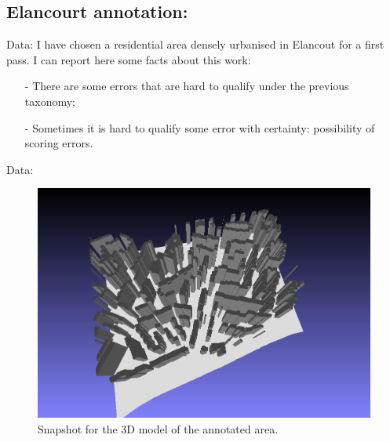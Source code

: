 \documentclass[9pt]{beamer}
\begin{document}
	\subsection[annotation]{Elancourt annotation:}
	\begin{frame}{Data:}
		I have chosen a residential area densely urbanised in Elancout for a first pass. I can report here some facts about this work:
		\begin{itemize}
			\item[-] There are some errors that are hard to qualify under the previous taxonomy;
			\item[-] Sometimes it is hard to qualify some error with certainty: possibility of scoring errors.
		\end{itemize}
	\end{frame}

	\begin{frame}{Data:}
		\begin{figure}
			\begin{center}
				\caption{\label{img::snapshot} Snapshot for the 3D model of the annotated area.}
				\includegraphics[scale=.2]{snapshot00.png}
			\end{center}
		\end{figure}
	\end{frame}
\end{document}
